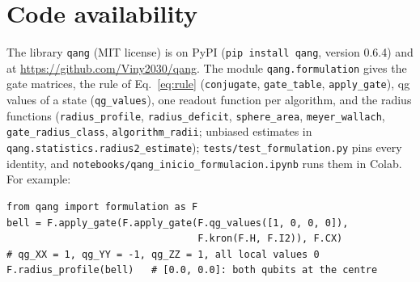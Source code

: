 \documentclass[11pt]{article}
\begin{document}
\section{Code availability}
The library \texttt{qang} (MIT license) is on PyPI (\texttt{pip install qang}, version 0.6.4) and at
\url{https://github.com/Viny2030/qang}. The module \texttt{qang.formulation} gives the gate matrices, the rule of
Eq.~\eqref{eq:rule} (\texttt{conjugate}, \texttt{gate\_table}, \texttt{apply\_gate}), qg values of a state
(\texttt{qg\_values}), one readout function per algorithm, and the radius functions (\texttt{radius\_profile},
\texttt{radius\_deficit}, \texttt{sphere\_area}, \texttt{meyer\_wallach}, \texttt{gate\_radius\_class},
\texttt{algorithm\_radii}; unbiased estimates in \texttt{qang.statistics.radius2\_estimate}); \texttt{tests/test\_formulation.py} pins every
identity, and \texttt{notebooks/qang\_inicio\_formulacion.ipynb} runs them in Colab. For example:
\begin{lstlisting}
from qang import formulation as F
bell = F.apply_gate(F.apply_gate(F.qg_values([1, 0, 0, 0]),
                                 F.kron(F.H, F.I2)), F.CX)
# qg_XX = 1, qg_YY = -1, qg_ZZ = 1, all local values 0
F.radius_profile(bell)   # [0.0, 0.0]: both qubits at the centre
\end{lstlisting}



\end{document}

